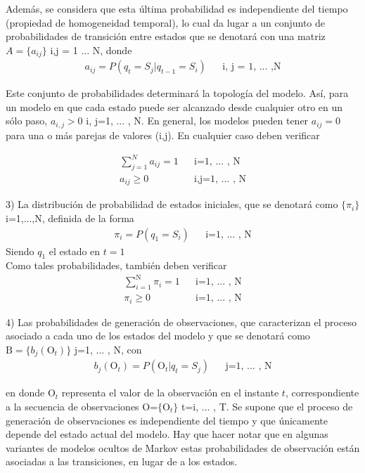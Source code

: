 Además, se considera que esta última probabilidad es independiente del tiempo (propiedad de homogeneidad temporal), lo cual da lugar a un conjunto de probabilidades de transición entre estados que se denotará con una matriz $A = \{ a_{ij} \}$ i,j = 1 ... N, donde
\begin{align*}
a_{ij}=P(q_t=S_j | q_{t-1}= S_i)        & & \text{i, j = 1, ... ,N}
\end{align*}


Este conjunto de probabilidades determinará la topología del modelo. Así, para un modelo en que cada estado puede ser alcanzado desde cualquier otro en un sólo paso, $a_{i,j}>0$  i, j=1, ... , N. En general, los modelos pueden tener $a_{ij}=0$ para una o más parejas de valores (i,j). En cualquier caso deben verificar

\begin{align}
\sum_{j=1}^{N} a_{ij}=1        & &\text{i=1, ... , N}    \\
a_{ij}\geq0                    & &\text{i,j=1, ... , N}
\end{align}

3) La distribución de probabilidad de estados iniciales, que se denotará como $\{\pi_i\}$ i=1,...,N, definida de la forma
\begin{align}
\pi_i=P(q_1=S_i)               & &\text{i=1, ... , N}
\end{align}
Siendo $q_1$ el estado en $t=1$ \\
Como tales probabilidades, también deben verificar
\begin{align}
\sum_{i=1}^{\mathrm{N}} \pi_i=1          & &\text{i=1, ... , N} \\
\pi_i \geq 0                             & &\text{i=1, ... , N}
\end{align}


4) Las probabilidades de generación de observaciones, que caracterizan el proceso asociado a cada uno de los estados del modelo y que se denotará como $\mathrm{B}=\{b_j(\mathrm{O}_t)\}$ j=1, ... , N, con
\begin{align}
b_j(\mathrm{O}_t)=P(\mathrm{O}_t | q_t=S_j)          & &\text{j=1, ... , N}
\end{align}

en donde O$_t$ representa el valor de la observación en el instante $t$, correspondiente a la secuencia de observaciones O=$\{\mathrm{O}_t\}$     t=i, ... , T. Se supone que el proceso de generación de observaciones es independiente del tiempo y que únicamente depende del estado actual del modelo. Hay que hacer notar que en algunas variantes de modelos ocultos de Markov estas probabilidades de observación están asociadas a las transiciones, en lugar de a los estados.

